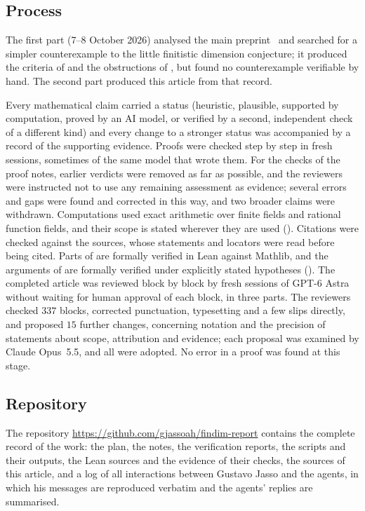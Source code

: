 \subsection*{Process}

The first part (7--8 October 2026) analysed the main
preprint~\cite{OAI26findim} and searched for a simpler counterexample to the
little finitistic dimension conjecture; it produced the criteria of
 and the obstructions of , but found
no counterexample verifiable by hand. The second part
produced this article from that record.

Every mathematical claim carried a status (heuristic, plausible, supported by
computation, proved by an AI model, or verified by a second, independent check
of a different kind) and every change to a stronger status was accompanied by a
record of the supporting evidence. Proofs were checked step by step in fresh
sessions, sometimes of
the same model that wrote them. For the checks of the proof notes, earlier
verdicts were removed as far as possible, and the reviewers were instructed not
to use any remaining assessment as evidence; several errors and gaps were found
and
corrected in this way, and two broader claims were withdrawn. Computations used
exact arithmetic over finite fields and rational function fields, and their
scope is stated wherever they are used (). Citations were
checked against the sources, whose statements and locators were read before
being cited. Parts of  are
formally verified in Lean against Mathlib, and the arguments of
 are formally verified under explicitly stated
hypotheses (). The completed article was reviewed block by
block by fresh sessions of GPT-6 Astra without waiting for human approval of
each block, in three parts. The reviewers checked
$337$ blocks, corrected punctuation, typesetting and a few slips directly, and
proposed $15$ further changes, concerning notation and the precision of
statements about scope, attribution and evidence; each proposal was examined
by Claude Opus~5.5, and all were adopted. No error in a proof was found at this
stage.

\subsection*{Repository}

The repository
\url{https://github.com/gjassoah/findim-report} contains the complete record of
the work: the plan, the
notes, the verification reports, the scripts and their outputs, the Lean
sources and the evidence of their checks, the sources of this article, and a
log of all interactions between Gustavo Jasso and the agents, in which his
messages are reproduced verbatim and the agents' replies are summarised.
